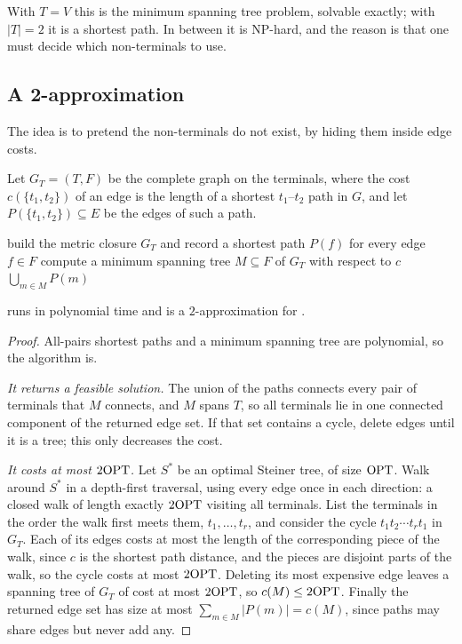 With $T = V$ this is the minimum spanning tree problem, solvable exactly; with
$|T| = 2$ it is a shortest path. In between it is \textrm{NP}-hard, and the
reason is that one must decide which non-terminals to use.

\subsection{A 2-approximation}

The idea is to pretend the non-terminals do not exist, by hiding them inside
edge costs.

\begin{definition}\label{def:metric-closure}
Let $G_T = (T,F)$ be the complete graph on the terminals, where the cost
$c(\{t_1,t_2\})$ of an edge is the length of a shortest $t_1$--$t_2$ path in
$G$, and let $P(\{t_1,t_2\}) \subseteq E$ be the edges of such a path.
\end{definition}

\begin{algorithm}[ht]
\caption{MST heuristic for }
\label{alg:steiner-mst}
\begin{algorithmic}[1]
  \State build the metric closure $G_T$ and record a shortest path $P(f)$ for
         every edge $f \in F$
  \State compute a minimum spanning tree $M \subseteq F$ of $G_T$ with respect
         to $c$
  \State \Return $\bigcup_{m \in M} P(m)$
\end{algorithmic}
\end{algorithm}

\begin{theorem}\label{thm:steiner-2approx}
 runs in polynomial time and is a $2$-approximation for
.
\end{theorem}

\begin{proof}
All-pairs shortest paths and a minimum spanning tree are polynomial, so the
algorithm is.

\emph{It returns a feasible solution.} The union of the paths connects every
pair of terminals that $M$ connects, and $M$ spans $T$, so all terminals lie in
one connected component of the returned edge set. If that set contains a cycle,
delete edges until it is a tree; this only decreases the cost.

\emph{It costs at most $2\mathrm{OPT}$.} Let $S^{*}$ be an optimal Steiner tree, of size
$\mathrm{OPT}$. Walk around $S^{*}$ in a depth-first traversal, using every edge once in
each direction: a closed walk of length exactly $2\mathrm{OPT}$ visiting all terminals.
List the terminals in the order the walk first meets them, $t_1, \dots, t_r$,
and consider the cycle $t_1 t_2 \cdots t_r t_1$ in $G_T$. Each of its edges
costs at most the length of the corresponding piece of the walk, since $c$ is
the shortest path distance, and the pieces are disjoint parts of the walk, so
the cycle costs at most $2\mathrm{OPT}$. Deleting its most expensive edge leaves a
spanning tree of $G_T$ of cost at most $2\mathrm{OPT}$, so $c(M) \le 2\mathrm{OPT}$. Finally the
returned edge set has size at most $\sum_{m \in M} |P(m)| = c(M)$, since paths
may share edges but never add any.
\end{proof}

